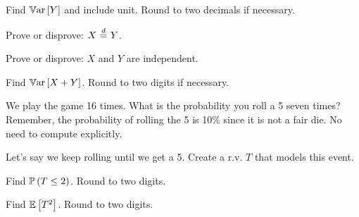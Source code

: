 \documentclass[12pt]{article}
\begin{document}
  Find $\mathbb{V}\text{ar}\left[Y\right]$ and include unit. Round to two decimals if necessary. 

  Prove or disprove: $X \equalsindist Y$. 

  Prove or disprove: $X$ and $Y$ are independent. 


 Find $\mathbb{V}\text{ar}\left[X+Y\right]$. Round to two digits if necessary. 


 We play the game 16 times. What is the probability you roll a 5 seven times? Remember, the probability of rolling the 5 is 10\% since it is not a fair die. No need to compute explicitly. 

 Let's say we keep rolling until we get a 5. Create a r.v. $T$ that models this event. 

 Find $\mathbb{P}\left(T \leq 2\right)$. Round to two digits.  


 Find $\mathbb{E}\left[T^2\right]$. Round to two digits.  
\eenum
\end{document}
